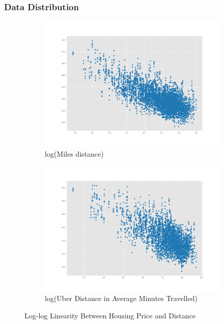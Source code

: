 \documentclass{article}
\begin{document}
\subsubsection{Data Distribution}

\begin{figure}[H]
  \begin{subfigure}{.5\textwidth}
      \centering
      \includegraphics[width=\linewidth]{images/scatter_miles.png}
      \caption{log(Miles distance)}
      \label{fig:3(a)}
  \end{subfigure}
  \begin{subfigure}{.5\textwidth}
      \centering
      \includegraphics[width=\linewidth]{images/scatter_uber.png}
      \caption{log(Uber Distance in Average Minutes Travelled)}
      \label{fig:3(b)}
  \end{subfigure}
  \caption{Log-log Linearity Between Housing Price and Distance}
  \label{fig:log_log}
\end{figure}
\end{document}
